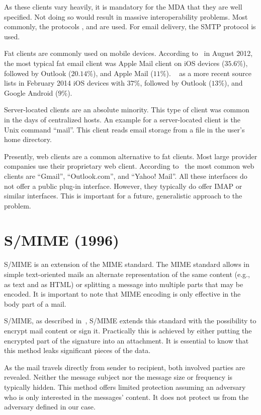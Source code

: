 As these clients vary heavily, it is mandatory for the MDA that they are well specified. Not doing so would result in massive interoperability problems. Most commonly, the protocols ,  and  are used. For email delivery, the SMTP protocol is used. 

Fat clients are commonly used on mobile devices. According to~\cite{clientDistribution} in August 2012, the most typical fat email client was Apple Mail client on iOS devices ($35.6\%$), followed by Outlook ($20.14\%$), and Apple Mail ($11\%$). ~\cite{clientDistribution2} as a more recent source lists in February 2014 iOS devices with $37\%$, followed by Outlook ($13\%$), and  Google Android ($9\%$).

Server-located clients are an absolute minority. This type of client was common in the days of centralized hosts. An example for a server-located client is the Unix command ``mail''. This client reads email storage from a file in the user's home directory.

Presently, web clients are a common alternative to fat clients. Most large provider companies use their proprietary web client. According to~\cite{clientDistribution2} the most common web clients are "`Gmail"', "`Outlook.com"', and "`Yahoo! Mail"'. All these interfaces do not offer a public plug-in interface. However, they typically do offer IMAP or similar interfaces. This is important for a future, generalistic approach to the problem.

\section{S/MIME (1996)}
S/MIME is an extension of the MIME standard. The MIME standard allows in simple text-oriented mails an alternate representation of the same content (e.g., as text and as HTML) or splitting a message into multiple parts that may be encoded. It is important to note that MIME encoding is only effective in the body part of a mail.

S/MIME, as described in~\cite{rfc3851}, S/MIME extends this standard with the possibility to encrypt mail content or sign it. Practically this is achieved by either putting the encrypted part of the signature into an attachment. It is essential to know that this method leaks significant pieces of the data.

As the mail travels directly from sender to recipient, both involved parties are revealed. Neither the message subject nor the message size or frequency is typically hidden. This method offers limited protection assuming an adversary who is only interested in the messages' content. It does not protect us from the adversary defined in our case. 

